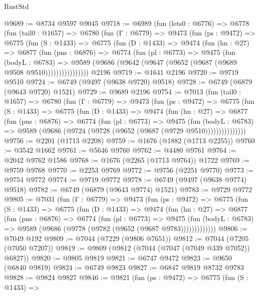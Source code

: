 \begin{lexlean}{RustStd}
\begin{coremodule}
@9689 := @8734 @9597 @9045
@9718 := @6989
    (fun (lets0 : @6776) =>
    @6778
      (fun (tail0 : @1657) =>
      @6780
        (fun (Γ : @6779) =>
        @9473
          (fun (ps : @9472) =>
          @6775
            (fun (S : @1433) =>
            @6775
              (fun (D : @1433) =>
              @9474
                (fun (hn : @27) =>
                @6877
                  (fun (pns : @6876) =>
                  @6774
                    (fun (pl : @6773) =>
                    @9475
                      (fun (bodyL : @6783) =>
                      @9589 (@9686 (@9642 (@9647 (@9652 (@9687 (@9689 @9508 @9510))))))))))))))))
    @2196
@9719 := @1641 @2196
@9720 := @9719 @9510
@9724 := @6749 (@9497 (@9638 @9720) @9518)
@9728 := @6749 (@6879 (@9643 @9720) @1521)
@9729 := @9689 @2196
@9754 := @7013
    (fun (tail0 : @1657) =>
    @6780
      (fun (Γ : @6779) =>
      @9473
        (fun (ps : @9472) =>
        @6775
          (fun (S : @1433) =>
          @6775
            (fun (D : @1433) =>
            @9474
              (fun (hn : @27) =>
              @6877
                (fun (pns : @6876) =>
                @6774
                  (fun (pl : @6773) =>
                  @9475
                    (fun (bodyL : @6783) =>
                    @9589 (@9686 (@9724 (@9728 (@9652 (@9687 (@9729 @9510)))))))))))))))
@9756 := @2201 (@1713 @2208)
@9759 := @1676 (@1882 (@1713 @2255))
@9760 := @3542 @1662
@9761 := @5646 @9760
@9762 := @4480 @9761
@9764 := @2042 @9762 @1586
@9768 := @1676 (@2265 (@1713 @9764)) @1722
@9769 := @9759 @9768
@9770 := @2253 @9769
@9772 := @9756 (@2251 @9770)
@9773 := @9754 @9772
@9774 := @9719 @9772
@9778 := @6749 (@9497 (@9638 @9774) @9518)
@9782 := @6749 (@6879 (@9643 @9774) @1521)
@9783 := @9729 @9772
@9805 := @7031
    (fun (Γ : @6779) =>
    @9473
      (fun (ps : @9472) =>
      @6775
        (fun (S : @1433) =>
        @6775
          (fun (D : @1433) =>
          @9474
            (fun (hn : @27) =>
            @6877
              (fun (pns : @6876) =>
              @6774
                (fun (pl : @6773) =>
                @9475
                  (fun (bodyL : @6783) =>
                  @9589 (@9686 (@9778 (@9782 (@9652 (@9687 @9783)))))))))))))
@9806 := @7049 @192
@9809 := @7044 (@7229 (@9806 @7651))
@9812 := @7044 (@7205 (@7050 @7207))
@9819 := @9809 (@9812 (@7044 (@7047 (@7049 @339 @7052)) @6827))
@9820 := @9805 @9819
@9821 := @6747 @9472
@9823 := @9650 (@6840 @9819)
@9824 := @6749 @9823
@9827 := @6847 @9819 @8732 @9783
@9828 := @9824 @9827
@9846 := @9821
    (fun (ps : @9472) =>
    @6775
      (fun (S : @1433) =>

\end{coremodule}
\end{lexlean}
